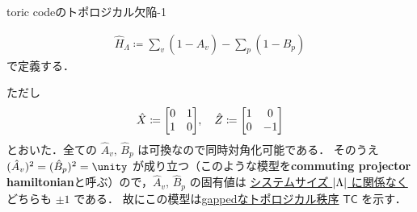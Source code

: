 \documentclass[TQFT_main]{subfiles}
\begin{document}
\begin{myexample}[label=ex:toric-emf]{toric codeのトポロジカル欠陥-1}
\begin{itemize}
\begin{align}
            \label{def:TC}
            \hat{H}_\Lambda \coloneqq \sum_{v}(1 - \hat{A}_v) - \sum_p (1 - \hat{B}_p)
        \end{align}
        で定義する．
    \end{itemize}
    ただし
    \begin{align}
        \hat{X} \coloneqq \mqty[0&1\\1&0],\quad \hat{Z} \coloneqq \mqty[1&0\\0&-1]
    \end{align}
    とおいた．全ての $\hat{A}_v,\, \hat{B}_p$ は可換なので同時対角化可能である．
    そのうえ $(\hat{A}_v)^2 = (\hat{B}_p)^2 = \unity$ が成り立つ（このような模型を\textbf{commuting projector hamiltonian}と呼ぶ）ので，$\hat{A}_v,\, \hat{B}_p$ の固有値は \underline{システムサイズ $\abs{\Lambda}$ に関係なく}どちらも $\pm 1$ である．
    故にこの模型は\hyperref[def:quantum-phase]{gappedなトポロジカル秩序} $\mathsf{TC}$ を示す．
    

\end{myexample}
\end{document}
